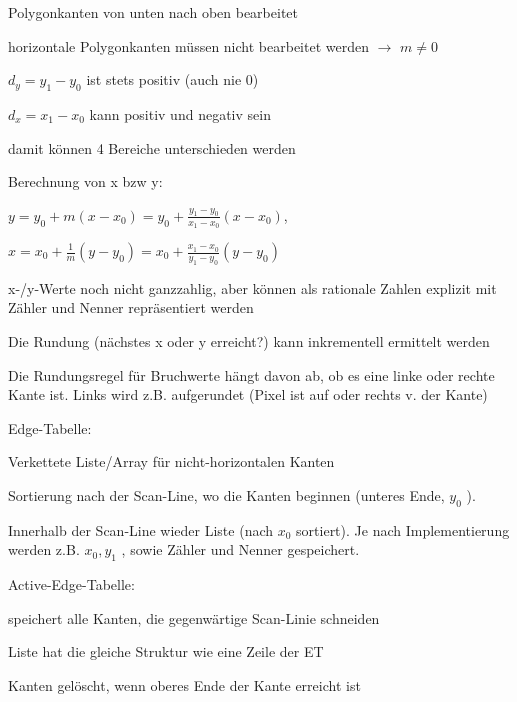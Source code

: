 \documentclass[landscape]{article}
\begin{document}
\begin{multicols}{3}
\begin{itemize*}
    \begin{itemize*}
      \item Polygonkanten von unten nach oben bearbeitet
      \item horizontale Polygonkanten müssen nicht bearbeitet werden $\rightarrow$ $m\not=0$
      \item $d_y = y_1 - y_0$ ist stets positiv (auch nie 0)
      \item $d_x = x_1 - x_0$ kann positiv und negativ sein
      \item damit können 4 Bereiche unterschieden werden
      \item Berechnung von x bzw y: 
      \begin{itemize*}
        \item $y=y_0+m(x-x_0)= y_0+\frac{y_1-y_0}{x_1-x_0}(x-x_0)$,
        \item$x=x_0+\frac{1}{m}(y-y_0)= x_0+\frac{x_1-x_0}{y_1-y_0}(y-y_0)$
      \end{itemize*}
      \item x-/y-Werte noch nicht ganzzahlig, aber können als rationale Zahlen explizit mit Zähler und Nenner repräsentiert werden
      \item Die Rundung (nächstes x oder y erreicht?) kann inkrementell ermittelt werden
      \item Die Rundungsregel für Bruchwerte hängt davon ab, ob es eine linke oder rechte Kante ist. Links wird z.B. aufgerundet (Pixel ist auf oder rechts v. der Kante)
    \end{itemize*}
    \item Edge-Tabelle:
    \begin{itemize*}
      \item  Verkettete Liste/Array für nicht-horizontalen Kanten
      \item  Sortierung nach der Scan-Line, wo die Kanten beginnen (unteres Ende, $y_0$ ).
      \item  Innerhalb der Scan-Line wieder Liste (nach $x_0$ sortiert). Je nach Implementierung werden z.B. $x_0 , y_1$ , sowie Zähler und Nenner gespeichert.
    \end{itemize*}
    \item Active-Edge-Tabelle:
    \begin{itemize*}
      \item  speichert alle Kanten, die gegenwärtige Scan-Linie schneiden
      \item  Liste hat die gleiche Struktur wie eine Zeile der ET
      \item  Kanten gelöscht, wenn oberes Ende der Kante erreicht ist

\end{itemize*}
\end{itemize*}
\end{multicols}
\end{document}
